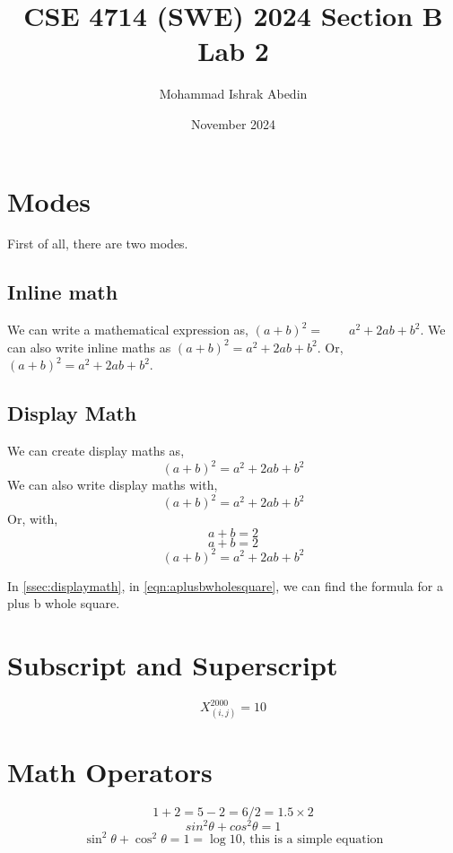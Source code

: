 \documentclass[a4paper, 12pt]{article}
\title{CSE 4714 (SWE) 2024 Section B Lab 2}
\author{Mohammad Ishrak Abedin}
\date{November 2024}
\begin{document}
\maketitle

\section{Modes}
First of all, there are two modes. 

\subsection{Inline math}
We can write a mathematical expression as, $             (a + b)^2 =\qquad a^2 + 2ab + b^2 $. We can also write inline maths as \( (a + b)^2 = a^2 + 2ab + b^2 \). Or,
\begin{math}
    (a + b)^2 = a^2 + 2ab + b^2
\end{math}.

\subsection{Display Math} \label{ssec:displaymath}
We can create display maths as, \[ (a + b)^2 = a^2 + 2ab + b^2 \] We can also write display maths with,
\begin{displaymath}
    (a + b)^2 = a^2 + 2ab + b^2
\end{displaymath}
Or, with,
\begin{equation}
    a + b = 2
\end{equation}
\begin{equation}
    a + b = 2
\end{equation}
\begin{equation} \label{eqn:aplusbwholesquare}
    (a + b)^2 = a^2 + 2ab + b^2
\end{equation}

In \autoref{ssec:displaymath}, in \autoref{eqn:aplusbwholesquare}, we can find the formula for a plus b whole square.

\section{Subscript and Superscript}
\begin{equation}
    X^{2000}_{(i,j)} = 10
\end{equation}

\section{Math Operators}
\begin{equation}
    1 + 2 = 5 - 2 = 6 / 2 = 1.5 \times 2
\end{equation}
\begin{equation}
    sin^2\theta + cos^2\theta = 1
\end{equation}
\begin{equation}
    \sin^2\theta + \cos^2\theta = 1 = \log{10} \text{, this is a simple equation}
\end{equation}
\end{document}
